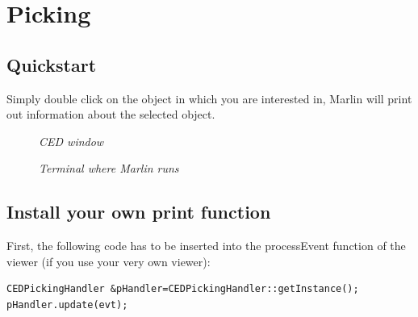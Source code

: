 \documentclass[a4paper,10pt]{article}
\begin{document}
\section{Picking}
\subsection{Quickstart}
Simply double click on the object in which you are interested in, Marlin will print out information about the selected object. 
\begin{figure}[h!]
\begin{minipage}[t]{6cm}
\setlength{\fboxsep}{0mm}
\centerline{}
\caption{\label{CEDViewer} \textsl{CED window}}
\end{minipage}
\hfill
\begin{minipage}[t]{6cm}
\setlength{\fboxsep}{0mm}
\centerline{}
\caption{\label{DSTViewer}\textsl{Terminal where Marlin runs}}
\end{minipage}
\end{figure}
 

\subsection{Install your own print function}\label{own_picking}
First, the following code has to be inserted into the processEvent function of the viewer (if you use your very own viewer):
\begin{verbatim}
CEDPickingHandler &pHandler=CEDPickingHandler::getInstance();
pHandler.update(evt);
\end{verbatim}
\end{document}
